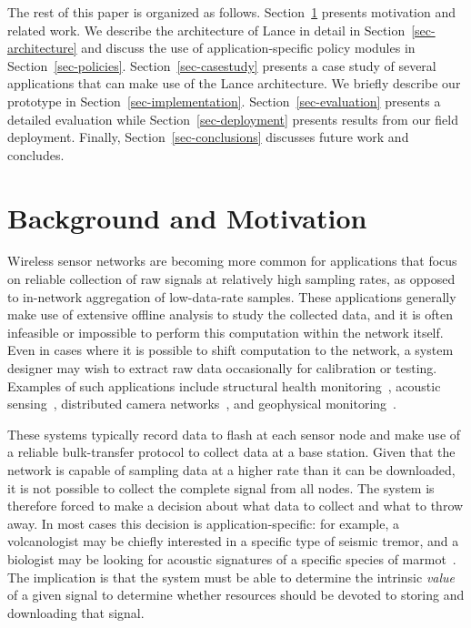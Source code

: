 \documentclass[lettersize]{sig-alternate-konrad}
\begin{document}
The rest of this paper is organized as follows.
Section~\ref{sec-motivation} presents motivation and related
work. We describe the architecture of Lance in detail in
Section~\ref{sec-architecture} and discuss the use of application-specific
policy modules in Section~\ref{sec-policies}.  Section~\ref{sec-casestudy}
presents a case study of several applications that can make use
of the Lance architecture.  We briefly describe our prototype in
Section~\ref{sec-implementation}.  Section~\ref{sec-evaluation}
presents a detailed evaluation while Section~\ref{sec-deployment}
presents results from our field deployment. Finally,
Section~\ref{sec-conclusions} discusses future work and concludes.

\section{Background and Motivation}
\label{sec-motivation}

Wireless sensor networks are becoming more common for applications
that focus on reliable collection of raw signals at relatively high sampling
rates, as opposed to in-network aggregation of low-data-rate samples.
These applications generally make use of extensive offline analysis 
to study the collected data, and it is often infeasible
or impossible to perform this computation within the network itself.
Even in cases where it is possible to shift computation to the network, a
system designer may wish to extract raw data occasionally for calibration
or testing.  Examples of such applications include structural health
monitoring~\cite{netshm-spots06,ggb-ipsn07,wimms-lynch06}, acoustic
sensing~\cite{vango,vigilnet,girod-ipsn07,enviromic}, distributed camera
networks~\cite{cyclops}, and geophysical monitoring~\cite{volcano-osdi06}.

These systems typically record data to flash at each sensor node 
and make use of a reliable bulk-transfer protocol to collect data at 
a base station. Given that the network is capable of sampling data at
a higher rate than it can be downloaded, it is not possible to 
collect the complete signal from all nodes. 
The system is therefore forced to make
a decision about what data to collect and what to throw away. In most
cases this decision is application-specific: for example, a
volcanologist may be chiefly interested in a specific type of seismic
tremor, and a biologist may be looking for acoustic signatures of a 
specific species of marmot~\cite{girod-ipsn07}. The implication is that
the system must be able to determine the intrinsic {\em value} of
a given signal to determine whether resources should be devoted to 
storing and downloading that signal.
\end{document}
